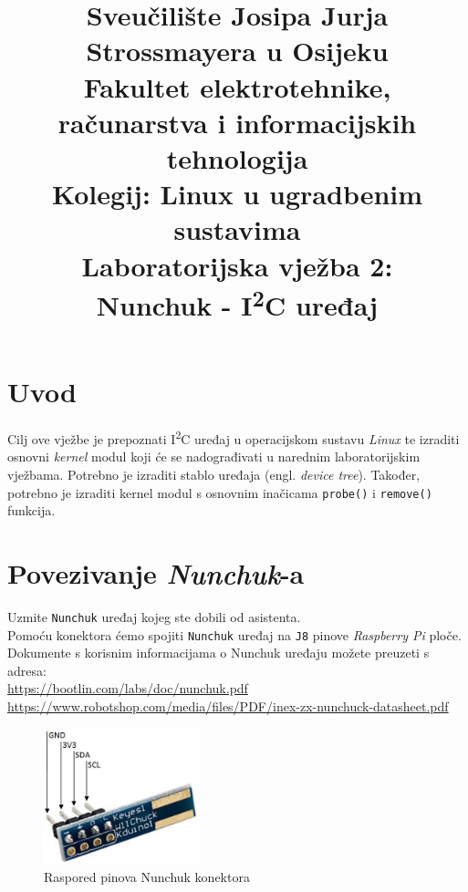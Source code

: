 \documentclass[11pt]{article}
\title{
	\Large Sveučilište Josipa Jurja Strossmayera u Osijeku \\
	Fakultet elektrotehnike, računarstva i informacijskih tehnologija \\
	\vspace{4cm}
	\Large Kolegij: Linux u ugradbenim sustavima \\
	\vspace{4cm}
	\Large \textbf{Laboratorijska vježba 2:\\
	Nunchuk - I\textsuperscript{2}C uređaj}
	}
\date{}
\begin{document}
\maketitle
\thispagestyle{empty}
\newpage

\section{Uvod}
Cilj ove vježbe je prepoznati I\textsuperscript{2}C uređaj u operacijskom
sustavu \textit{Linux} te izraditi osnovni \textit{kernel} modul koji će se
nadograđivati u narednim laboratorijskim vježbama. Potrebno je izraditi
stablo uređaja (engl. \textit{device tree}). Također, potrebno je izraditi
kernel modul s osnovnim inačicama \texttt{probe()} i \texttt{remove()} funkcija.

\section{Povezivanje \textit{Nunchuk}-a}
Uzmite \texttt{Nunchuk} uređaj kojeg ste dobili od asistenta.\\
Pomoću konektora ćemo spojiti \texttt{Nunchuk} uređaj na \texttt{J8} pinove
\textit{Raspberry Pi} ploče.\\
Dokumente s korisnim informacijama o Nunchuk uređaju možete preuzeti s adresa:\\
\url{https://bootlin.com/labs/doc/nunchuk.pdf}\\
\url{https://www.robotshop.com/media/files/PDF/inex-zx-nunchuck-datasheet.pdf}\\

\begin{figure}[h!]
\centering
\includegraphics[width=0.4\textwidth]{nunchuk-connector.jpg}
\captionsetup{justification=centering}
\caption{Raspored pinova Nunchuk konektora}
\end{figure}
\end{document}
